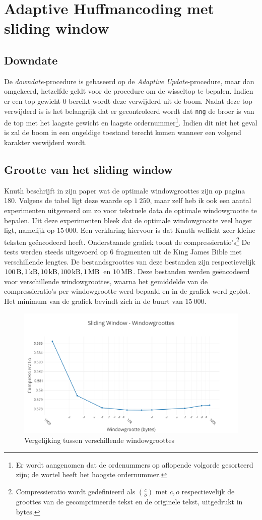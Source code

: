\section{Adaptive Huffmancoding met sliding window}

\subsection{Downdate}
De \emph{downdate}-procedure is gebaseerd op de \emph{Adaptive Update}-procedure, maar dan omgekeerd, hetzelfde geldt voor de procedure om de wisseltop te bepalen. Indien er een top gewicht $0$ bereikt wordt deze verwijderd uit de boom. Nadat deze top verwijderd is is het belangrijk dat er gecontroleerd wordt dat \texttt{nng} de broer is van de top met het laagste gewicht en laagste ordernummer\footnote{Er wordt aangenomen dat de ordenummers op aflopende volgorde gesorteerd zijn; de wortel heeft het hoogste ordernummer.}. Indien dit niet het geval is zal de boom in een ongeldige toestand terecht komen wanneer een volgend karakter verwijderd wordt. 

\subsection{Grootte van het sliding window}
Knuth beschrijft in zijn paper \cite{knuthhuffman} wat de optimale windowgroottes zijn op pagina 180. Volgens de tabel ligt deze waarde op \texttt{$1\ 250$}, maar zelf heb ik ook een aantal experimenten uitgevoerd om zo voor tekstuele data de optimale windowgrootte te bepalen. Uit deze experimenten bleek dat de optimale windowgrootte veel hoger ligt, namelijk op \texttt{$15\ 000$}. Een verklaring hiervoor is dat Knuth wellicht zeer kleine teksten ge\"encodeerd heeft. Onderstaande grafiek toont de compressieratio's\footnote{Compressieratio wordt gedefinieerd als $(\frac{c}{o})$ met $c,o$ respectievelijk de groottes van de gecomprimeerde tekst en de originele tekst, uitgedrukt in bytes.} De tests werden steeds uitgevoerd op 6 fragmenten uit de King James Bible \cite{gutenbergbible} met verschillende lengtes. De bestandsgroottes van deze bestanden zijn respectievelijk $\SI{100}{\byte}, \SI{1}{\kilo\byte}, \SI{10}{\kilo\byte}, \SI{100}{\kilo\byte}, \SI{1}{\mega\byte}$ en $\SI{10}{\mega\byte}$. Deze bestanden werden ge\"encodeerd voor verschillende windowgroottes, waarna het gemiddelde van de compressieratio's per windowgrootte werd bepaald en in de grafiek werd geplot. Het minimum van de grafiek bevindt zich in de buurt van \texttt{$15\ 000$}.

\begin{figure}[h]
	\centering
	\includegraphics[width=0.9\linewidth]{resources/sliding-window.png}
	\caption{Vergelijking tussen verschillende windowgroottes}
\end{figure}